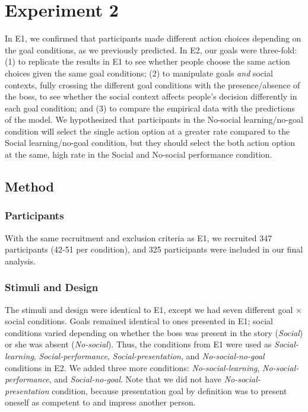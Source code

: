 \documentclass[10pt, letterpaper]{article}
\begin{document}
\section{Experiment 2}\label{experiment-2}

In E1, we confirmed that participants made different action choices
depending on the goal conditions, as we previously predicted. In E2, our
goals were three-fold: (1) to replicate the results in E1 to see whether
people choose the same action choices given the same goal conditions;
(2) to manipulate goals \emph{and} social contexts, fully crossing the
different goal conditions with the presence/absence of the boss, to see
whether the social context affects people's decision differently in each
goal condition; and (3) to compare the empirical data with the
predictions of the model. We hypothesized that participants in the
No-social learning/no-goal condition will select the single action
option at a greater rate compared to the Social learning/no-goal
condition, but they should select the both action option at the same,
high rate in the Social and No-social performance condition.

\subsection{Method}\label{method-1}

\subsubsection{Participants}\label{participants-1}

With the same recruitment and exclusion criteria as E1, we recruited 347
participants (42-51 per condition), and 325 participants were included
in our final analysis.

\subsubsection{Stimuli and Design}\label{stimuli-and-design-1}

The stimuli and design were identical to E1, except we had seven
different goal \(\times\) social conditions. Goals remained identical to
ones presented in E1; social conditions varied depending on whether the
boss was present in the story (\emph{Social}) or she was absent
(\emph{No-social}). Thus, the conditions from E1 were used as
\emph{Social-learning}, \emph{Social-performance},
\emph{Social-presentation}, and \emph{No-social-no-goal} conditions in
E2. We added three more conditions: \emph{No-social-learning},
\emph{No-social-performance}, and \emph{Social-no-goal}. Note that we
did not have \emph{No-social-presentation} condition, because
presentation goal by definition was to present oneself as competent to
and impress another person.
\end{document}
